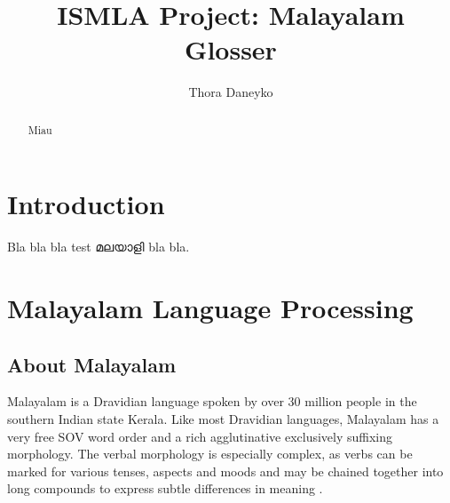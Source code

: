 \documentclass[a4paper]{article}
\author{Thora Daneyko}
\title{ISMLA Project: Malayalam Glosser}
\begin{document}
\maketitle

\begin{abstract}
Miau
\end{abstract}


\begingroup
{}

\section{Introduction}

Bla bla bla test മലയാളി bla bla.

\section{Malayalam Language Processing}

\subsection{About Malayalam}

Malayalam is a Dravidian language spoken by over 30 million people in the southern Indian state Kerala. Like most Dravidian languages, Malayalam has a very free SOV word order and a rich agglutinative exclusively suffixing morphology. The verbal morphology is especially complex, as verbs can be marked for various tenses, aspects and moods and may be chained together into long compounds to express subtle differences in meaning \parencite{asherKumari}.
\end{document}
